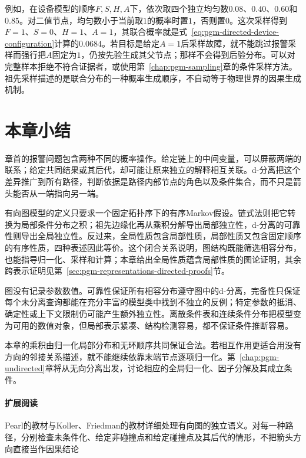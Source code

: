 例如，在设备模型的顺序$F,S,H,A$下，依次取四个独立均匀数$0.08$、$0.40$、$0.60$和$0.85$。对二值节点，均匀数小于当前取$1$的概率时置$1$，否则置$0$。这次采样得到$F=1$、$S=0$、$H=1$、$A=1$，其联合概率就是式~\eqref{eq:pgm-directed-device-configuration}计算的$0.0684$。若目标是给定$A=1$后采样故障，就不能跳过报警采样而强行把$A$固定为$1$，仍按先验生成其父节点；那样不会得到后验分布。可以对完整样本拒绝不符合证据者，或使用第~\ref{chap:pgm-sampling}章的条件采样方法。祖先采样描述的是联合分布的一种概率生成顺序，不自动等于物理世界的因果生成机制。

\section{本章小结}
\label{sec:pgm-directed-summary}

章首的报警问题包含两种不同的概率操作。给定链上的中间变量，可以屏蔽两端的联系；给定共同结果或其后代，却可能让原来独立的解释相互关联。d-分离把这个差异推广到所有路径，判断依据是路径内部节点的角色以及条件集合，而不只是箭头能否从一端指向另一端。

有向图模型的定义只要求一个固定拓扑序下的有序Markov假设。链式法则把它转换为局部条件分布之积；祖先边缘化再从乘积分解导出局部独立性，d-分离的可靠性则导出全局独立性。反过来，全局性质包含局部性质，局部性质又包含固定顺序的有序性质，四种表述因此等价。这个闭合关系说明，图结构既能筛选相容分布，也能指导归一化、采样和计算；本章给出全局性质蕴含局部性质的图论证明，其余跨表示证明见第~\ref{sec:pgm-representations-directed-proofs}节。

图没有记录参数数值。可靠性保证所有相容分布遵守图中的d-分离，完备性只保证每个未分离查询都能在充分丰富的模型类中找到不独立的反例；特定参数的抵消、确定性或上下文限制仍可能产生额外独立性。离散条件表和连续条件分布把模型变为可用的数值对象，但局部表示紧凑、结构检测容易，都不保证条件推断容易。

本章的乘积由归一化局部分布和无环顺序共同保证合法。若相互作用更适合用没有方向的邻接关系描述，就不能继续依靠末端节点逐项归一化。第~\ref{chap:pgm-undirected}章将从无向分离出发，讨论相应的全局归一化、因子分解及其成立条件。

\paragraph{扩展阅读}
Pearl的教材与Koller、Friedman的教材详细处理有向图的独立语义。对每一种路径，分别检查未条件化、给定非碰撞点和给定碰撞点及其后代的情形，不把箭头方向直接当作因果结论
